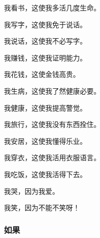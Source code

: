 \par 我看书，这使我多活几度生命。
\par 
\par 我写字，这使我免于说话。
\par 
\par 我说话，这使我不必写字。
\par 
\par 我赚钱，这使我证明能力。
\par 
\par 我花钱，这使金钱高贵。
\par 
\par 我生病，这使我了然健康必要。
\par 
\par 我健康，这使我提高警觉。
\par 
\par 我旅行，这使我没有东西拴住。
\par 
\par 我安居，这使我懂得乐业。
\par 
\par 我穿衣，这使我活用衣服语言。
\par 
\par 我吃饭，这使我活得下去。
\par 
\par 我哭，因为我爱。
\par 
\par 我笑，因为不能不笑呀！



\subsubsection{如果}


